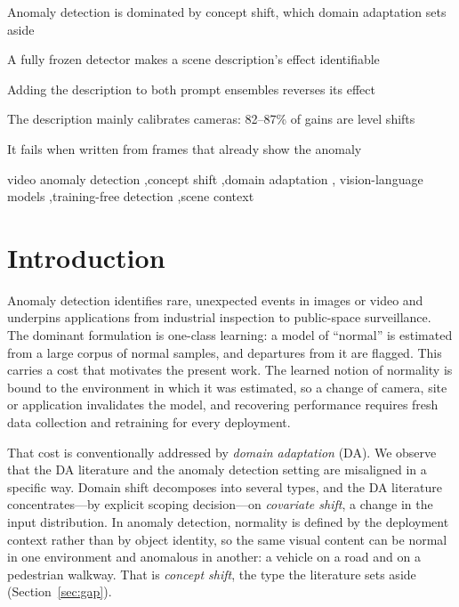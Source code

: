 \documentclass[a4paper,fleqn]{cas-sc}
\begin{document}
\begin{highlights}
\item Anomaly detection is dominated by concept shift, which domain adaptation sets aside
\item A fully frozen detector makes a scene description's effect identifiable
\item Adding the description to both prompt ensembles reverses its effect
\item The description mainly calibrates cameras: 82--87\% of gains are level shifts
\item It fails when written from frames that already show the anomaly
\end{highlights}

\begin{keywords}
video anomaly detection \sep concept shift \sep domain adaptation \sep
vision-language models \sep training-free detection \sep scene context
\end{keywords}

\maketitle

\section{Introduction}
\label{sec:intro}

Anomaly detection identifies rare, unexpected events in images or video and
underpins applications from industrial inspection to public-space surveillance.
The dominant formulation is one-class learning: a model of ``normal'' is estimated
from a large corpus of normal samples, and departures from it are flagged. This
carries a cost that motivates the present work. The learned notion of normality is
bound to the environment in which it was estimated, so a change of camera, site or
application invalidates the model, and recovering performance requires fresh data
collection and retraining for every deployment.

That cost is conventionally addressed by \emph{domain adaptation} (DA). We observe
that the DA literature and the anomaly detection setting are misaligned in a
specific way. Domain shift decomposes into several types, and the DA literature
concentrates---by explicit scoping decision---on \emph{covariate shift}, a change in
the input distribution. In anomaly detection, normality is defined by the deployment
context rather than by object identity, so the same visual content can be normal in
one environment and anomalous in another: a vehicle on a road and on a pedestrian
walkway. That is \emph{concept shift}, the type the literature sets aside
(Section~\ref{sec:gap}).
\end{document}
